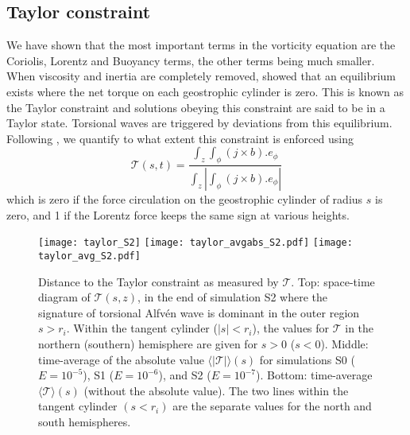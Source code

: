 \documentclass[12pt, a4paper]{article}
\begin{document}
\subsection{Taylor constraint}		\label{sec:taylor}

We have shown that the most important terms in the vorticity equation are the Coriolis, Lorentz and Buoyancy terms, the other terms being much smaller.
When viscosity and inertia are completely removed, \cite{taylor1963} showed that an equilibrium exists where the net torque on each geostrophic cylinder is zero.
This is known as the Taylor constraint and solutions obeying this constraint are said to be in a Taylor state.
Torsional waves are triggered by deviations from this equilibrium.
Following \citet{wicht2010}, we quantify to what extent this constraint is enforced using
\begin{equation}
 \mathcal{T}(s,t) = \frac{ \int_z \int_\phi (j \times b).e_\phi } {\int_z \left| \int_\phi (j \times b).e_\phi \right| }
\end{equation}
which is zero if the force circulation on the geostrophic cylinder of radius $s$ is zero, and 1 if the Lorentz force keeps the same sign at various heights.

\begin{figure}
\begin{center}
\texttt{[image: taylor\_S2]}
\texttt{[image: taylor\_avgabs\_S2.pdf]}
\texttt{[image: taylor\_avg\_S2.pdf]}

\caption{Distance to the Taylor constraint as measured by $\mathcal{T}$.
Top: space-time diagram of $\mathcal{T}(s,z)$, in the end of simulation S2 where the signature of torsional Alfvén wave is dominant in the outer region $s>r_i$.
Within the tangent cylinder ($|s|<r_i$), the values for $\mathcal{T}$ in the northern (southern) hemisphere are given for $s>0$ ($s<0$).
Middle: time-average of the absolute value $\langle|\mathcal{T}|\rangle(s)$ for simulations S0 ($E=10^{-5}$), S1 ($E=10^{-6}$), and S2 ($E=10^{-7}$).
Bottom: time-average $\langle\mathcal{T}\rangle(s)$ (without the absolute value).
The two lines within the tangent cylinder $(s<r_i)$ are the separate values for the north and south hemispheres.
}
\label{fig:taylor}
\end{center}
\end{figure}
\end{document}
